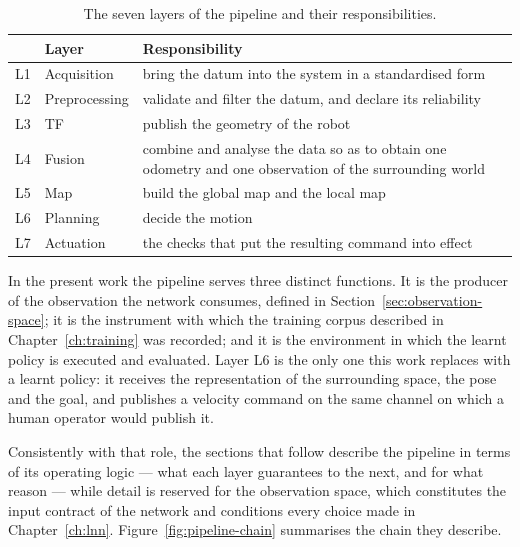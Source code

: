 \begin{table}[H]
  \centering
  \caption{The seven layers of the pipeline and their responsibilities.}
  \label{tab:layers}
  \begin{tabular}{@{}llp{7.8cm}@{}}
    \toprule
    & \textbf{Layer} & \textbf{Responsibility} \\
    \midrule
    L1 & Acquisition   & bring the datum into the system in a standardised form \\
    L2 & Preprocessing & validate and filter the datum, and declare its reliability \\
    L3 & TF            & publish the geometry of the robot \\
    L4 & Fusion        & combine and analyse the data so as to obtain one odometry and one observation of the surrounding world \\
    L5 & Map           & build the global map and the local map \\
    L6 & Planning      & decide the motion \\
    L7 & Actuation     & the checks that put the resulting command into effect \\
    \bottomrule
  \end{tabular}
\end{table}

In the present work the pipeline serves three distinct functions. It is the
producer of the observation the network consumes, defined in
Section~\ref{sec:observation-space}; it is the instrument with which the
training corpus described in Chapter~\ref{ch:training} was recorded; and it is
the environment in which the learnt policy is executed and evaluated. Layer L6
is the only one this work replaces with a learnt policy: it receives the
representation of the surrounding space, the pose and the goal, and publishes a
velocity command on the same channel on which a human operator would publish it.

Consistently with that role, the sections that follow describe the pipeline in
terms of its operating logic --- what each layer guarantees to the next, and for
what reason --- while detail is reserved for the observation space, which
constitutes the input contract of the network and conditions every choice made
in Chapter~\ref{ch:lnn}. Figure~\ref{fig:pipeline-chain} summarises the chain
they describe.


